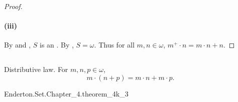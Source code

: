 \documentclass{report}
\begin{document}
\begin{proof}
    \paragraph{(iii)}%

      By  and
        , $S$ is an
        .
      By , $S = \omega$.
      Thus for all $m, n \in \omega$, $m^+ \cdot n = m \cdot n + n$.

  \end{proof}

\subsection{}

  \begin{theorem}[4K-3]
    Distributive law.
    For $m, n, p \in \omega$, $$m \cdot (n + p) = m \cdot n + m \cdot p.$$
  \end{theorem}

    {Enderton.Set.Chapter\_4.theorem\_4k\_3}

\end{document}
